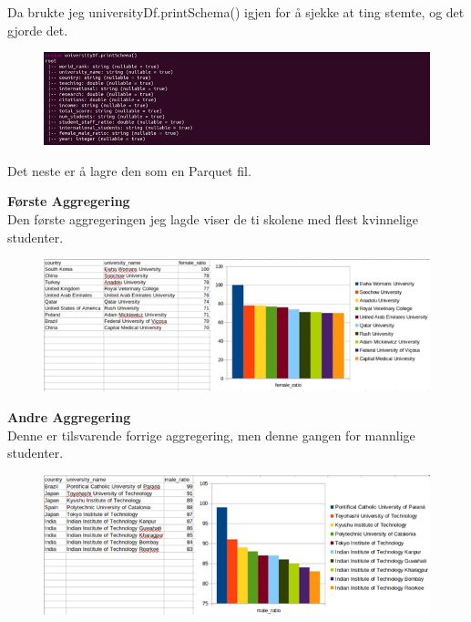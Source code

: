 Da brukte jeg universityDf.printSchema() igjen for å sjekke at ting stemte, og det gjorde det.
\FigureCounter
\begin{figure}[H]
    \includegraphics[width=\textwidth]{images/milepael5/printSchema.png}
\end{figure}

Det neste er å lagre den som en Parquet fil.


\textbf{Første Aggregering}\\
Den første aggregeringen jeg lagde viser de ti skolene med flest kvinnelige studenter. 

\FigureCounter
\begin{figure}[H]
    \includegraphics[width=\textwidth]{images/milepael5/resUniFemRatio.png}
\end{figure}

\textbf{Andre Aggregering}\\
Denne er tilsvarende forrige aggregering, men denne gangen for mannlige studenter.

\FigureCounter
\begin{figure}[H]
    \includegraphics[width=\textwidth]{images/milepael5/resUniMaleRatio.png}
\end{figure}

